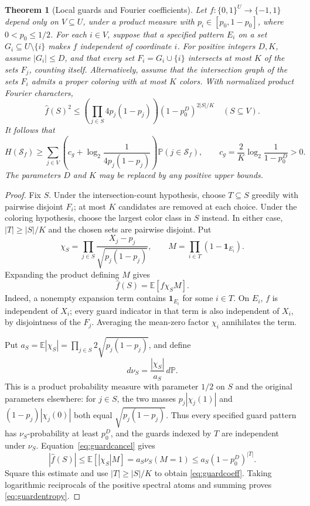 \documentclass[11pt]{amsart}
\newtheorem{theorem}{Theorem}[section]
\theoremstyle{remark}
\newcommand{\Prob}{\mathbb P}
\newcommand{\E}{\mathbb E}
\newcommand{\one}{\mathbf 1}
\newcommand{\cS}{\mathcal S}
\begin{document}
\begin{theorem}[Local guards and Fourier coefficients]\label{thm:guards}
Let $f:\{0,1\}^U\to\{-1,1\}$ depend only on $V\subseteq U$, under a product measure with $p_i\in[p_0,1-p_0]$, where $0<p_0\le1/2$. For each $i\in V$, suppose that a specified pattern $E_i$ on a set $G_i\subseteq U\setminus\{i\}$ makes $f$ independent of coordinate $i$. For positive integers $D,K$, assume $|G_i|\le D$, and that every set $F_i=G_i\cup\{i\}$ intersects at most $K$ of the sets $F_j$, counting itself. Alternatively, assume that the intersection graph of the sets $F_i$ admits a proper coloring with at most $K$ colors. With normalized product Fourier characters,
\begin{equation}\label{eq:guardcoeff}
 \widehat f(S)^2\le
 \left(\prod_{j\in S}4p_j(1-p_j)\right)(1-p_0^D)^{2|S|/K}
 \quad(S\subseteq V).
\end{equation}
It follows that
\begin{equation}\label{eq:guardentropy}
 H(\cS_f)\ge\sum_{j\in V}
 \left(c_g+\log_2\frac1{4p_j(1-p_j)}\right)
 \Prob(j\in\cS_f),\qquad
 c_g=\frac{2}{K}\log_2\frac1{1-p_0^D}>0.
\end{equation}
The parameters $D$ and $K$ may be replaced by any positive upper bounds.
\end{theorem}
\begin{proof}
Fix $S$. Under the intersection-count hypothesis, choose $T\subseteq S$ greedily with pairwise disjoint $F_i$; at most $K$ candidates are removed at each choice. Under the coloring hypothesis, choose the largest color class in $S$ instead. In either case, $|T|\ge|S|/K$ and the chosen sets are pairwise disjoint. Put
\[
 \chi_S=\prod_{j\in S}\frac{X_j-p_j}{\sqrt{p_j(1-p_j)}},
 \qquad M=\prod_{i\in T}(1-\one_{E_i}).
\]
Expanding the product defining $M$ gives
\begin{equation}\label{eq:guardcancel}
 \widehat f(S)=\E[f\chi_S M].
\end{equation}
Indeed, a nonempty expansion term contains $\one_{E_i}$ for some $i\in T$. On $E_i$, $f$ is independent of $X_i$; every guard indicator in that term is also independent of $X_i$, by disjointness of the $F_j$. Averaging the mean-zero factor $\chi_i$ annihilates the term.

Put $a_S=\E|\chi_S|=\prod_{j\in S}2\sqrt{p_j(1-p_j)}$, and define
\[
 d\nu_S=\frac{|\chi_S|}{a_S}\,d\Prob.
\]
This is a product probability measure with parameter $1/2$ on $S$ and the original parameters elsewhere: for $j\in S$, the two masses $p_j|\chi_j(1)|$ and $(1-p_j)|\chi_j(0)|$ both equal $\sqrt{p_j(1-p_j)}$. Thus every specified guard pattern has $\nu_S$-probability at least $p_0^D$, and the guards indexed by $T$ are independent under $\nu_S$. Equation~\eqref{eq:guardcancel} gives
\[
 |\widehat f(S)|\le\E[|\chi_S|M]
 =a_S\nu_S(M=1)\le a_S(1-p_0^D)^{|T|}.
\]
Square this estimate and use $|T|\ge|S|/K$ to obtain \eqref{eq:guardcoeff}. Taking logarithmic reciprocals of the positive spectral atoms and summing proves \eqref{eq:guardentropy}.
\end{proof}
\end{document}
